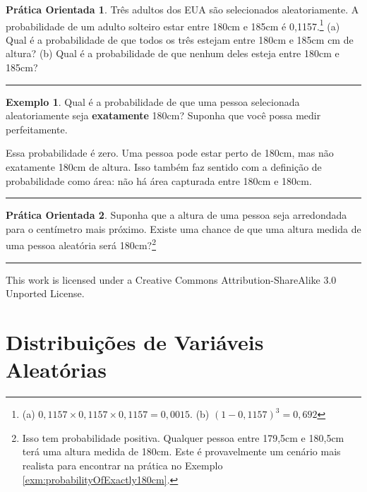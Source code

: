 \documentclass[
]{book}
\theoremstyle{definition}
\theoremstyle{definition}
\newtheorem{example}{Exemplo}[chapter]
\theoremstyle{definition}
\newtheorem{exercise}{Prática Orientada}[chapter]
\theoremstyle{definition}
\theoremstyle{remark}
\begin{document}
\begin{exercise}
\protect\hypertarget{exr:unnamed-chunk-82}{}{\label{exr:unnamed-chunk-82} }Três adultos dos EUA são selecionados aleatoriamente. A probabilidade de um adulto solteiro estar entre 180cm e 185cm é 0,1157.\footnote{(a) \(0,1157 \times 0,1157 \times 0,1157 = 0,0015\). (b) \((1-0,1157)^3 = 0,692\)}
(a) Qual é a probabilidade de que todos os três estejam entre 180cm e 185cm cm de altura?
(b) Qual é a probabilidade de que nenhum deles esteja entre 180cm e 185cm?
\end{exercise}

\begin{center}\rule{0.5\linewidth}{0.5pt}\end{center}

\begin{example}
\protect\hypertarget{exm:probabilityOfExactly180cm}{}{\label{exm:probabilityOfExactly180cm} }Qual é a probabilidade de que uma pessoa selecionada aleatoriamente seja \textbf{exatamente} 180cm? Suponha que você possa medir perfeitamente.
\end{example}

Essa probabilidade é zero. Uma pessoa pode estar perto de 180cm, mas não exatamente 180cm de altura. Isso também faz sentido com a definição de probabilidade como área: não há área capturada entre 180cm e 180cm.

\begin{center}\rule{0.5\linewidth}{0.5pt}\end{center}

\begin{exercise}
\protect\hypertarget{exr:unnamed-chunk-83}{}{\label{exr:unnamed-chunk-83} }Suponha que a altura de uma pessoa seja arredondada para o centímetro mais próximo. Existe uma chance de que uma altura medida de uma pessoa aleatória será 180cm?\footnote{Isso tem probabilidade positiva. Qualquer pessoa entre 179,5cm e 180,5cm terá uma altura medida de 180cm. Este é provavelmente um cenário mais realista para encontrar na prática no Exemplo \ref{exm:probabilityOfExactly180cm}.}
\end{exercise}

\begin{center}\rule{0.5\linewidth}{0.5pt}\end{center}

This work is licensed under a Creative Commons Attribution-ShareAlike 3.0 Unported License.

\hypertarget{ch3-distribuicoes}{%
\chapter{Distribuições de Variáveis Aleatórias}\label{ch3-distribuicoes}}
\end{document}

